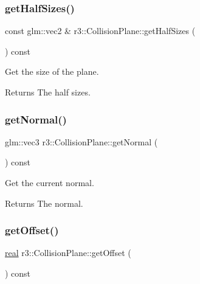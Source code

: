 \subsubsection{\texorpdfstring{get\+Half\+Sizes()}{getHalfSizes()}}
{\footnotesize\ttfamily const glm\+::vec2 \& r3\+::\+Collision\+Plane\+::get\+Half\+Sizes (\begin{DoxyParamCaption}{ }\end{DoxyParamCaption}) const}



Get the size of the plane. 

\begin{DoxyReturn}{Returns}
The half sizes. 
\end{DoxyReturn}
\mbox{\label{classr3_1_1_collision_plane_aa6605acf447da4e45084e6d25c1067ad}} 
\subsubsection{\texorpdfstring{get\+Normal()}{getNormal()}}
{\footnotesize\ttfamily glm\+::vec3 r3\+::\+Collision\+Plane\+::get\+Normal (\begin{DoxyParamCaption}{ }\end{DoxyParamCaption}) const}



Get the current normal. 

\begin{DoxyReturn}{Returns}
The normal. 
\end{DoxyReturn}
\mbox{\label{classr3_1_1_collision_plane_a62e2b4bd6a811f8d2541329cd9a49bf8}} 
\subsubsection{\texorpdfstring{get\+Offset()}{getOffset()}}
{\footnotesize\ttfamily \mbox{\hyperlink{namespacer3_ab2016b3e3f743fb735afce242f0dc1eb}{real}} r3\+::\+Collision\+Plane\+::get\+Offset (\begin{DoxyParamCaption}{ }\end{DoxyParamCaption}) const}



